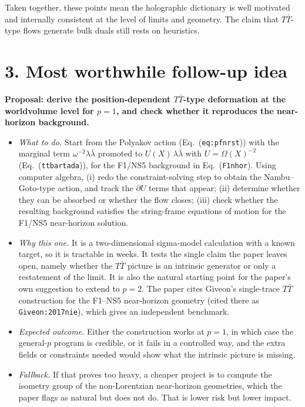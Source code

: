 \documentclass[11pt]{article}
\begin{document}
Taken together, these points mean the holographic dictionary is well motivated and internally consistent at the level of limits and geometry. The claim that $T\bar T$-type flows generate bulk duals still rests on heuristics.

\section*{3. Most worthwhile follow-up idea}

\textbf{Proposal: derive the position-dependent $T\bar T$-type deformation at the worldvolume level for $p=1$, and check whether it reproduces the near-horizon background.}

\begin{itemize}
\item \emph{What to do.} Start from the Polyakov action (Eq.~(\texttt{eq:pfnrst})) with the marginal term $\omega^{-2}\lambda\bar\lambda$ promoted to $U(X)\,\lambda\bar\lambda$ with $U=\Omega(X)^{-2}$ (Eq.~(\texttt{ttbartada})), for the F1/NS5 background in Eq.~(\texttt{F1nhor}). Using computer algebra, (i) redo the constraint-solving step to obtain the Nambu--Goto-type action, and track the $\partial U$ terms that appear; (ii) determine whether they can be absorbed or whether the flow closes; (iii) check whether the resulting background satisfies the string-frame equations of motion for the F1/NS5 near-horizon solution.
\item \emph{Why this one.} It is a two-dimensional sigma-model calculation with a known target, so it is tractable in weeks. It tests the single claim the paper leaves open, namely whether the $T\bar T$ picture is an intrinsic generator or only a restatement of the limit. It is also the natural starting point for the paper's own suggestion to extend to $p=2$. The paper cites Giveon's single-trace $T\bar T$ construction for the F1--NS5 near-horizon geometry (cited there as \texttt{Giveon:2017nie}), which gives an independent benchmark.
\item \emph{Expected outcome.} Either the construction works at $p=1$, in which case the general-$p$ program is credible, or it fails in a controlled way, and the extra fields or constraints needed would show what the intrinsic picture is missing.
\item \emph{Fallback.} If that proves too heavy, a cheaper project is to compute the isometry group of the non-Lorentzian near-horizon geometries, which the paper flags as natural but does not do. That is lower risk but lower impact.
\end{itemize}
\end{document}
